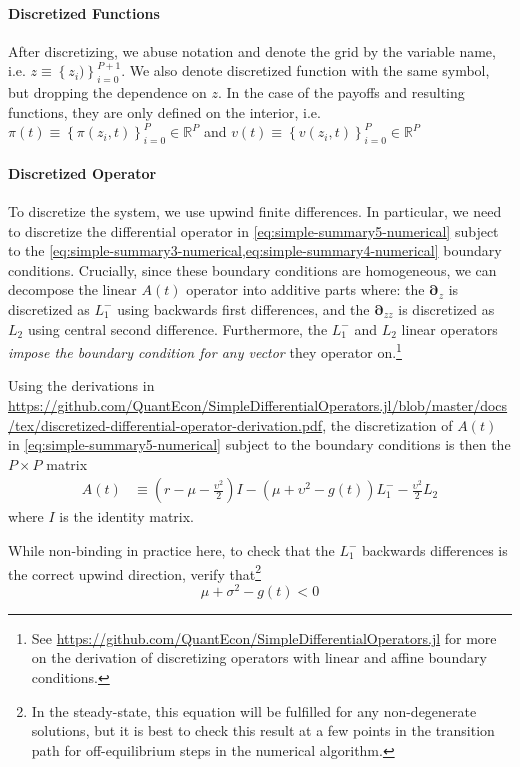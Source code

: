 \documentclass[11pt]{article}
\newcommand{\D}[1][]{\ensuremath{\boldsymbol{\partial}_{#1}}}
\newcommand{\R}{\ensuremath{\mathbb{R}}}
\newcommand{\set}[1]{\ensuremath{\left\{{#1}\right\}}}
\begin{document}
\paragraph{Discretized Functions}

After discretizing, we abuse notation and denote the grid by the variable name, i.e. $z \equiv \set{z_i)}_{i=0}^{P+1}$.  We also denote discretized function with the same symbol, but dropping the dependence on $z$.  In the case of the payoffs and resulting functions, they are only defined on the interior, i.e. $\pi(t) \equiv \set{\pi(z_i,t)}_{i=0}^P\in \R^P$ and $v(t) \equiv \set{v(z_i,t)}_{i=0}^P\in \R^P$

\paragraph{Discretized Operator}

To discretize the system, we use upwind finite differences.  In particular, we need to discretize the differential operator in \cref{eq:simple-summary5-numerical} subject to the \cref{eq:simple-summary3-numerical,eq:simple-summary4-numerical} boundary conditions.  Crucially, since these boundary conditions are homogeneous, we can decompose the linear $A(t)$ operator into additive parts where: the $\D[z]$ is discretized as $L^{-}_1$ using backwards first differences, and the $\D[zz]$ is discretized as $L_2$ using central second difference.   Furthermore, the $L^{-}_1$ and $L_2$ linear operators \textit{impose the boundary condition for any vector} they operator on.\footnote{See \url{https://github.com/QuantEcon/SimpleDifferentialOperators.jl} for more on the derivation of discretizing operators with linear and affine boundary conditions.}

Using the derivations in \url{https://github.com/QuantEcon/SimpleDifferentialOperators.jl/blob/master/docs/tex/discretized-differential-operator-derivation.pdf}, the discretization of $A(t)$ in \cref{eq:simple-summary5-numerical} subject to the boundary conditions is then the $P \times P$ matrix
\begin{align}
A(t) &\equiv \left(r - \mu - \frac{\upsilon^2}{2}\right) I - (\mu + \upsilon^2 - g(t)) L^{-}_1 - \frac{\upsilon^2}{2} L_2 \label{eq:A-def-simple}
\end{align}
where $I$ is the identity matrix.

While non-binding in practice here, to check that the  $L^{-}_1$ backwards differences is the correct upwind direction, verify that\footnote{In the steady-state, this equation will be fulfilled for any non-degenerate solutions, but it is best to check this result at a few points in the transition path for off-equilibrium steps in the numerical algorithm.}
\begin{equation}
\mu + \sigma^2 - g(t) < 0
\end{equation}
\end{document}
